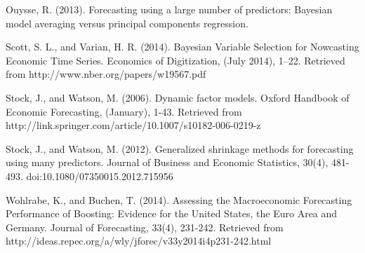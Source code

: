 Ouysse, R. (2013). Forecasting using a large number of predictors: Bayesian model averaging versus principal components regression.






Scott, S. L., and Varian, H. R. (2014). Bayesian Variable Selection for Nowcasting Economic Time Series. Economics of Digitization, (July 2014), 1–22. Retrieved from http://www.nber.org/papers/w19567.pdf


Stock, J., and Watson, M. (2006). Dynamic factor models. Oxford Handbook of Economic Forecasting, (January), 1-43. Retrieved from http://link.springer.com/article/10.1007/s10182-006-0219-z







Stock, J., and Watson, M. (2012). Generalized shrinkage methods for forecasting using many predictors. Journal of Business and Economic Statistics, 30(4), 481-493. doi:10.1080/07350015.2012.715956  














Wohlrabe, K., and Buchen, T. (2014). Assessing the Macroeconomic Forecasting Performance of Boosting: Evidence for the United States, the Euro Area and Germany. Journal of Forecasting, 33(4), 231-242. Retrieved from http://ideas.repec.org/a/wly/jforec/v33y2014i4p231-242.html
